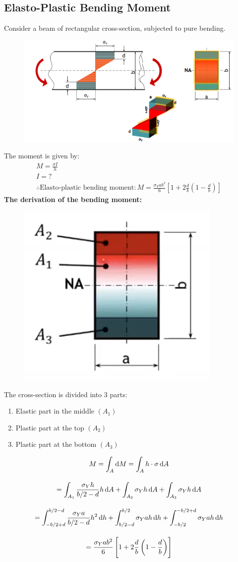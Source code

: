 \documentclass[class=report, crop=false, 12pt,a4paper]{standalone}
\begin{document}
\subsection{Elasto-Plastic Bending Moment}
Consider a beam of rectangular cross-section, subjected to pure bending.
\begin{figure}[H]
  \centering
  \includegraphics[width = 0.9 \textwidth]{../img/beam15.PNG}
\end{figure}
The moment is given by:
\begin{gather}
  M = \frac{\sigma I}{h} \\
  I = ? \\
  \therefore \text{Elasto-plastic bending moment}: M = \frac{\sigma_Y ab^2}{6}\left[1+2\frac{d}{b}\left(1-\frac{d}{b}\right)\right]
\end{gather}
\textbf{The derivation of the bending moment:}
\begin{figure}[H]
  \centering
  \includegraphics[width = 0.3 \textwidth]{../img/beam16.PNG}
\end{figure}
The cross-section is divided into 3 parts:
\begin{enumerate}
  \item Elastic part in the middle $(A_1)$
  \item Plastic part at the top $(A_2)$
  \item Plastic part at the bottom $(A_3)$
\end{enumerate}
\begin{gather}
  M = \int_{A}\dif M = \int_{A}h\cdot \sigma \dif A \\[10pt]
  = \int_{A_1}\frac{\sigma_Y h}{b/2-d}h\dif A + \int_{A_2}\sigma_Y h\dif A + \int_{A_3}\sigma_Y h\dif A \\[10pt]
  = \int_{-b/2+d}^{b/2-d}\frac{\sigma_Y a}{b/2-d}h^2\dif h + \int_{b/2-d}^{b/2}\sigma_Y ah\dif h + \int_{-b/2}^{-b/2+d}\sigma_Y ah\dif h \\[10pt]
  = \frac{\sigma_Y ab^2}{6}\left[1+2\frac{d}{b}\left(1-\frac{d}{b}\right)\right] 
\end{gather}
\end{document}
